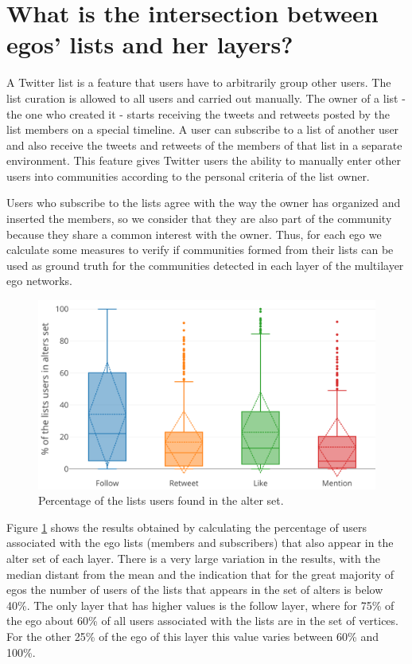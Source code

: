 

\section{What is the intersection between egos' lists and her layers?}
\label{sec:QuestionTwitterLists}
A Twitter list is a feature that users have to arbitrarily group other users. The list curation is allowed to all users and carried out manually. The owner of a list - the one who created it - starts receiving the tweets and retweets posted by the list members on a special timeline. A user can subscribe to a list of another user and also receive the tweets and retweets of the members of that list in a separate environment. This feature gives Twitter users the ability to manually enter other users into communities according to the personal criteria of the list owner.

Users who subscribe to the lists agree with the way the owner has organized and inserted the members, so we consider that they are also part of the community because they share a common interest with the owner. Thus, for each ego we calculate some measures to verify if communities formed from their lists can be used as ground truth for the communities detected in each layer of the multilayer ego networks.

\begin{figure}[h!tb]
    \centering
    \includegraphics[width=1\textwidth]{fig/lists_stats/alters_intersection_over_lists_set.png}
    \caption{Percentage of the lists users found in the alter set.}
    \label{fig:lists_alters_over_lists}
\end{figure}

Figure \ref{fig:lists_alters_over_lists} shows the results obtained by calculating the percentage of users associated with the ego lists (members and subscribers) that also appear in the alter set of each layer. There is a very large variation in the results, with the median distant from the mean and the indication that for the great majority of egos the number of users of the lists that appears in the set of alters is below 40\%. The only layer that has higher values is the follow layer, where for 75\% of the ego about 60\% of all users associated with the lists are in the set of vertices. For the other 25\% of the ego of this layer this value varies between 60\% and 100\%.

